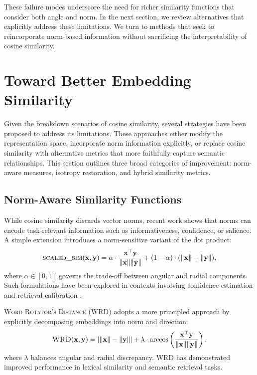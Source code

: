 \documentclass[11pt]{article}
\begin{document}
These failure modes underscore the need for richer similarity functions that consider both angle and norm. In the next section, we review alternatives that explicitly address these limitations. We turn to methods that seek to reincorporate norm-based information without sacrificing the interpretability of cosine similarity.


\section{Toward Better Embedding Similarity}\label{sec:alternatives}

Given the breakdown scenarios of cosine similarity, several strategies have been proposed to address its limitations. These approaches either modify the representation space, incorporate norm information explicitly, or replace cosine similarity with alternative metrics that more faithfully capture semantic relationships. This section outlines three broad categories of improvement: norm-aware measures, isotropy restoration, and hybrid similarity metrics.

\subsection{Norm-Aware Similarity Functions}

While cosine similarity discards vector norms, recent work shows that norms can encode task-relevant information such as informativeness, confidence, or salience. A simple extension introduces a norm-sensitive variant of the dot product:
\begin{equation*}
	\textsc{scaled\_sim}(\mathbf{x}, \mathbf{y}) = \alpha \cdot \frac{\mathbf{x}^\top \mathbf{y}}{\|\mathbf{x}\| \|\mathbf{y}\|} + (1 - \alpha) \cdot (\|\mathbf{x}\| + \|\mathbf{y}\|),
\end{equation*}
where $\alpha \in [0, 1]$ governs the trade-off between angular and radial components. Such formulations have been explored in contexts involving confidence estimation and retrieval calibration \citep{oyama_2023_NormWordEmbedding, radford_2021_LearningTransferableVisual}.

\textsc{Word Rotator's Distance (WRD)} \citep{yokoi_2020_WordRotatorsDistance} adopts a more principled approach by explicitly decomposing embeddings into norm and direction:
\begin{equation*}
	\textsc{WRD}(\mathbf{x}, \mathbf{y}) = |\|\mathbf{x}\| - \|\mathbf{y}\|| + \lambda \cdot \arccos\left( \frac{\mathbf{x}^\top \mathbf{y}}{\|\mathbf{x}\| \|\mathbf{y}\|} \right),
\end{equation*}
where $\lambda$ balances angular and radial discrepancy. \textsc{WRD} has demonstrated improved performance in lexical similarity and semantic retrieval tasks.
\end{document}
